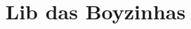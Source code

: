 \documentclass[10pt,a4paper]{article}
\title{\vspace{-4ex}\Large{Lib das Boyzinhas}}
\author{}
\date{}
\begin{document}
\begin{landscape}
\begin{multicols*}{3}  %
\raggedcolumns 
{}

\maketitle
\vspace{-13ex}
\tableofcontents
\pagestyle{fancy}



\end{multicols*}
\end{landscape}
\end{document}
